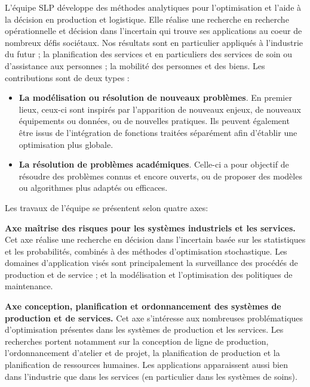L'équipe SLP développe des méthodes analytiques pour l'optimisation et l'aide à la décision en production et logistique. 
Elle réalise une recherche en recherche opérationnelle et décision dans l'incertain qui trouve ses applications au coeur de nombreux défis sociétaux.
Nos résultats sont en particulier appliqués à l'industrie du futur ; la planification des services et en particuliers des services de soin ou d'assistance aux personnes ; la mobilité des personnes et des biens.
Les contributions sont de deux types : 
\begin{itemize}
\item \textbf{La modélisation ou résolution de nouveaux problèmes}. En premier lieux, ceux-ci sont  inspirés par l'apparition de nouveaux enjeux, de nouveaux équipements ou données, ou de nouvelles pratiques. 
Ils peuvent également être issus de l'intégration de fonctions traitées séparément afin d'établir une optimisation plus globale. 
\item \textbf{La résolution de problèmes académiques}. Celle-ci a pour objectif de résoudre des problèmes connus et encore ouverts, ou de proposer des modèles ou algorithmes plus adaptés ou efficaces.
\end{itemize}

\smallskip
\noindent Les travaux de l'équipe se présentent selon quatre axes:

\textbf{Axe maîtrise des risques pour les systèmes industriels et les services.} 
    Cet axe réalise une recherche en décision dans l'incertain basée sur les statistiques et les probabilités, combinés à des méthodes d'optimisation stochastique.
    Les domaines d'application visés sont principalement 
    la surveillance des procédés de production et de service ; et
    la modélisation et l'optimisation des politiques de maintenance.
    
\textbf{Axe conception, planification et ordonnancement des systèmes de production et de services.}
Cet axe s'intéresse aux nombreuses problématiques d'optimisation présentes dans les systèmes de production et les services. 
Les recherches portent notamment sur la conception de ligne de production, l'ordonnancement d'atelier et de projet, la planification de production et la planification de ressources humaines. 
Les applications apparaissent aussi bien dans l'industrie que dans les services (en particulier dans les systèmes de soins).

